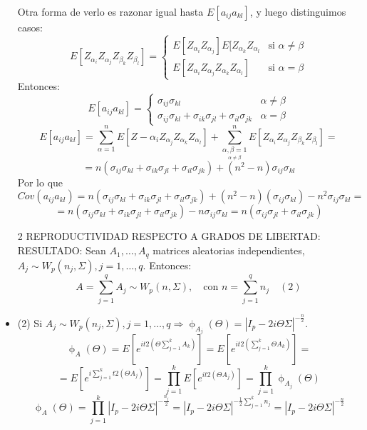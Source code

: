 \documentclass[11pt,a4paper]{article}
\begin{document}
\begin{itemize}
Otra forma de verlo es razonar igual hasta $E[a_{ij}a_{kl}]$, y luego distinguimos casos:
$$E[Z_{\alpha_{i}} Z_{\alpha_{j}} Z_{\beta_{k}} Z_{\beta_{l}}] = \begin{cases}
E[Z_{\alpha_{i}}Z_{\alpha_{j}}] E[Z_{\alpha_{k}} Z_{\alpha_{l}} & \text{si } \alpha \neq \beta \\
E[Z_{\alpha_{i}} Z_{\alpha_{j}} Z_{\alpha_{k}} Z_{\alpha_{l}}] & \text{si } \alpha = \beta
\end{cases}$$
Entonces:
$$E[a_{ij}a_{kl}] = \begin{cases}
\sigma_{ij}\sigma_{kl} & \alpha \neq \beta \\
\sigma_{ij}\sigma_{kl} + \sigma_{ik}\sigma_{jl} + \sigma_{il}\sigma_{jk} & \alpha = \beta 
\end{cases}$$
$$E[a_{ij}a_{kl}] = \sum_{\alpha=1}^{n} E[Z-{\alpha_{i}} Z_{\alpha_{j}} Z_{\alpha_{k}} Z_{\alpha_{l}}] + \sum_{\underset{\alpha \neq \beta}{\alpha, \beta = 1}}^{n} E[Z_{\alpha_{i}} Z_{\alpha_{j}} Z_{\beta_{k}} Z_{\beta_{l}}] =$$
$$= n(\sigma_{ij}\sigma_{kl} + \sigma_{ik}\sigma_{jl} + \sigma_{il}\sigma_{jk}) + (n^{2}-n)\sigma_{ij}\sigma_{kl}$$
Por lo que
$$Cov(a_{ij}a_{kl}) = n(\sigma_{ij}\sigma_{kl} + \sigma_{ik}\sigma_{jl} + \sigma_{il}\sigma_{jk}) + (n^{2}-n)(\sigma_{ij}\sigma_{kl}) - n^{2}\sigma_{ij}\sigma_{kl} =$$
$$= n(\sigma_{ij}\sigma_{kl} + \sigma_{ik}\sigma_{jl} + \sigma_{il}\sigma_{jk}) - n\sigma_{ij}\sigma_{kl} = n(\sigma_{ij}\sigma_{jl} + \sigma_{il}\sigma_{jk})$$

\item[2] REPRODUCTIVIDAD RESPECTO A GRADOS DE LIBERTAD: \\
RESULTADO: Sean $A_{1}, \dots, A_{q}$ matrices aleatorias independientes, $A_{j} \sim W_{p}(n_{j}, \Sigma), j = 1, \dots, q$. Entonces:
$$A = \sum_{j=1}^{q} A_{j} \sim W_{p}(n, \Sigma), \quad \text{con } n = \sum_{j=1}^{q}n_{j} \quad (2)$$

\item (2) Si $A_{j} \sim W_{p}(n_{j}, \Sigma), j = 1, \dots, q \Rightarrow \upphi_{A_{j}}(\Theta) = |I_{p} - 2i\Theta\Sigma|^{-\frac{n}{2}}$.
$$\upphi_{A}(\Theta) = E[e^{it2(\Theta\sum_{j=1}^{k}A_{k})}] = E[e^{it2(\sum_{j=1}^{k}\Theta A_{k})}] =$$ 
$$= E[e^{i\sum_{j=1}^{k}t2(\Theta A_{j})}] = \prod_{j=1}^{k} E[e^{it2(\Theta A_{j})}] = \prod_{j=1}^{k} \upphi_{A_{j}}(\Theta)$$
$$\upphi_{A}(\Theta) = \prod_{j=1}^{k} |I_{p} - 2i\Theta\Sigma|^{-\frac{n_{j}}{2}} = |I_{p} - 2i\Theta\Sigma|^{-\frac{1}{2} \sum_{j=1}^{k}n_{j}} = |I_{p} - 2i\Theta\Sigma|^{-\frac{n}{2}}$$


\end{itemize}
\end{document}
